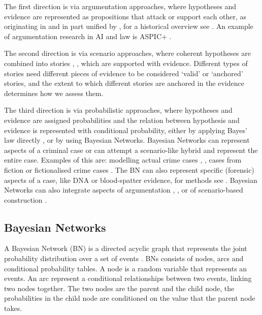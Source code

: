\documentclass[12pt]{article}
\begin{document}
The first direction is via argumentation approaches, where hypotheses and evidence are represented as propositions that attack or support each other, as originating in \citep{wigmore1931} and in part unified by \citet{dung1995}, for a historical overview see \citep{benchcapon2019}. An example of argumentation research in AI and law is ASPIC+ \citep{prakkenEtal2013}. 

The second direction is via scenario approaches, where coherent hypotheses are combined into stories \citep{penningtonHastie1993}, \citep{wagenaarEtal1993}, which are supported with evidence. Different types of stories need different pieces of evidence to be considered `valid' or `anchored' stories, and the extent to which different stories are anchored in the evidence determines how we assess them. 

The third direction is via probabilistic approaches, where hypotheses and evidence are assigned probabilities and the relation between hypothesis and evidence is represented with conditional probability, either by applying Bayes' law directly \citep{dahlman2020}, or by using Bayesian Networks. Bayesian Networks can represent aspects of a criminal case or can attempt a scenario-like hybrid and represent the entire case. Examples of this are: modelling actual crime cases \citep{kadaneSchum1996}, \citep{Fenton2019},  cases from fiction \citep{Fenton2012} or fictionalised crime cases \citep{vanLeeuwen2019}. The BN can also represent specific (forensic) aspects of a case, like DNA or blood-spatter evidence, for methods see \citep{Meester2021}. Bayesian Networks can also integrate aspects of argumentation \citep{wieten2019}, \citep{timmer2017}, or of scenario-based construction \citep{vlek2016}.



\subsection{Bayesian Networks}

A Bayesian Network (BN) is a directed acyclic graph that represents the joint probability distribution over a set of events \citep{pearl1988b}. BNs consists of nodes, arcs and conditional probability tables. A node is a random variable that represents an events. An arc represent a conditional relationships between two events, linking two nodes together. The two nodes are the parent and the child node, the probabilities in the child node are conditioned on the value that the parent node takes.
\end{document}
